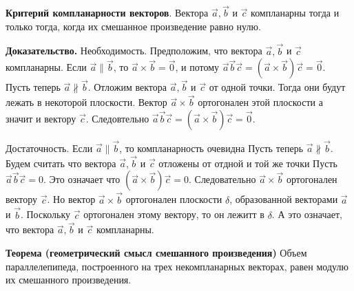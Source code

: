 \documentclass[a4paper]{article}
\begin{document}
\begin{htheorem}
\textbf{Критерий компланарности векторов}. Вектора $\vec{a}, \vec{b}$ и $\vec{c}$ компланарны тогда и только тогда, когда их смешанное
произведение равно нулю.
\end{htheorem}

\begin{hproof}
\textbf{Доказательство.} Необходимость. Предположим, что вектора $\vec{a}, \vec{b}$ и $\vec{c}$ компланарны. Если $\vec{a} \parallel \vec{b}$, то $\vec{a} \times \vec{b} = \vec{0}$, и потому $\vec{a} \vec{b} \vec{c} = (\vec{a} \times \vec{b} ) \vec{c} = \vec{0}$. \\
Пусть теперь $\vec{a} \nparallel \vec{b}$. Отложим вектора $\vec{a}, \vec{b}$ и $\vec{c}$ от одной точки. Тогда они будут лежать в некоторой плоскости. Вектор $\vec{a} \times \vec{b}$ ортогонален этой плоскости а значит и вектору $\vec{c}$. Следовтельно $\vec{a} \vec{b} \vec{c} = (\vec{a} \times \vec{b} ) \vec{c} = \vec{0}$.

Достаточность. Если $\vec{a} \parallel \vec{b}$, то компланарность очевидна Пусть теперь $\vec{a} \nparallel \vec{b}$. Будем считать что вектора $\vec{a}, \vec{b}$ и $\vec{c}$ отложены от отдной и той же точки Пусть $\vec{a} \vec{b} \vec{c} = 0$. Это означает что $(\vec{a} \times \vec{b}) \vec{c} = 0$. Следовательно $\vec{a} \times \vec{b}$ ортогонален вектору $\vec{c}$. Но вектор $\vec{a} \times \vec{b}$ ортогонален плоскости $\delta$, образованной векторами $\vec{a}$ и $\vec{b}$. Поскольку $\vec{c}$ ортогонален этому вектору, то он лежитт в $\delta$. А это означает, что вектора $\vec{a}, \vec{b}$ и $\vec{c}$ компланарны.
\end{hproof}


\begin{htheorem}
\textbf{Теорема  (геометрический смысл смешанного произведения)} Объем параллелепипеда, построенного на трех некомпланарных векторах,
равен модулю их смешанного произведения.
\end{htheorem}
\end{document}
